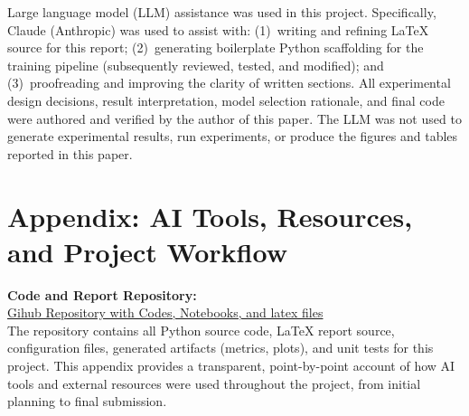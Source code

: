 \documentclass{article}
\begin{document}
Large language model (LLM) assistance was used in this project.
Specifically, Claude (Anthropic) was used to assist with: (1)~writing and
refining LaTeX source for this report; (2)~generating boilerplate Python
scaffolding for the training pipeline (subsequently reviewed, tested, and
modified); and (3)~proofreading and improving the clarity of written sections.
All experimental design decisions, result interpretation, model selection
rationale, and final code were authored and verified by the author of this paper.
The LLM was not used to generate experimental results, run experiments,
or produce the figures and tables reported in this paper.




\appendix

\section*{Appendix: AI Tools, Resources, and Project Workflow}

\noindent\textbf{Code and Report Repository:}\\
\href{https://github.com/asbandara/wan_anomaly_repo}{Gihub Repository with Codes, Notebooks, and latex files}\\
The repository contains all Python source code, LaTeX report source, configuration
files, generated artifacts (metrics, plots), and unit tests for this project.
This appendix provides a transparent, point-by-point account of how AI tools and
external resources were used throughout the project, from initial planning to
final submission.
\end{document}
